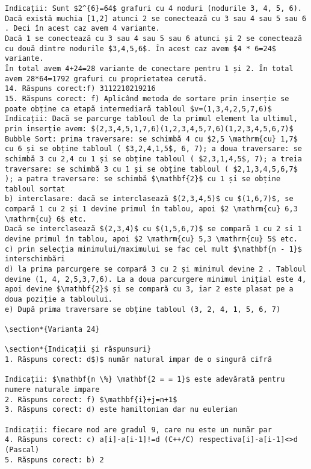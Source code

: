 \begin{verbatim}
Indicații: Sunt $2^{6}=64$ grafuri cu 4 noduri (nodurile 3, 4, 5, 6).
Dacă există muchia [1,2] atunci 2 se conectează cu 3 sau 4 sau 5 sau 6 . Deci în acest caz avem 4 variante.
Dacă 1 se conectează cu 3 sau 4 sau 5 sau 6 atunci și 2 se conectează cu două dintre nodurile $3,4,5,6$. În acest caz avem $4 * 6=24$ variante.
În total avem 4+24=28 variante de conectare pentru 1 și 2. În total avem 28*64=1792 grafuri cu proprietatea cerută.
14. Răspuns corect:f) 3112210219216
15. Răspuns corect: f) Aplicând metoda de sortare prin inserție se poate obține ca etapă intermediară tabloul $v=(1,3,4,2,5,7,6)$
Indicații: Dacă se parcurge tabloul de la primul element la ultimul, prin inserție avem: $(2,3,4,5,1,7,6)(1,2,3,4,5,7,6)(1,2,3,4,5,6,7)$
Bubble Sort: prima traversare: se schimbă 4 cu $2,5 \mathrm{cu} 1,7$ cu 6 și se obține tabloul ( $3,2,4,1,5$, 6, 7); a doua traversare: se schimbă 3 cu 2,4 cu 1 și se obține tabloul ( $2,3,1,4,5$, 7); a treia traversare: se schimbă 3 cu 1 și se obține tabloul ( $2,1,3,4,5,6,7$ ); a patra traversare: se schimbă $\mathbf{2}$ cu 1 și se obține tabloul sortat
b) interclasare: dacă se interclasează $(2,3,4,5)$ cu $(1,6,7)$, se compară 1 cu 2 și 1 devine primul în tablou, apoi $2 \mathrm{cu} 6,3 \mathrm{cu} 6$ etc.
Dacă se interclasează $(2,3,4)$ cu $(1,5,6,7)$ se compară 1 cu 2 si 1 devine primul în tablou, apoi $2 \mathrm{cu} 5,3 \mathrm{cu} 5$ etc.
c) prin selecția minimului/maximului se fac cel mult $\mathbf{n - 1}$ interschimbări
d) la prima parcurgere se compară 3 cu 2 și minimul devine 2 . Tabloul devine (1, 4, 2,5,3,7,6). La a doua parcurgere minimul inițial este 4, apoi devine $\mathbf{2}$ și se compară cu 3, iar 2 este plasat pe a doua poziție a tabloului.
e) După prima traversare se obține tabloul (3, 2, 4, 1, 5, 6, 7)

\section*{Varianta 24}

\section*{Indicații și răspunsuri}
1. Răspuns corect: d$)$ număr natural impar de o singură cifră

Indicații: $\mathbf{n \%} \mathbf{2 = = 1}$ este adevărată pentru numere naturale impare
2. Răspuns corect: f) $\mathbf{i}+j=n+1$
3. Răspuns corect: d) este hamiltonian dar nu eulerian

Indicații: fiecare nod are gradul 9, care nu este un număr par
4. Răspuns corect: c) a[i]-a[i-1]!=d (C++/C) respectiva[i]-a[i-1]<>d (Pascal)
5. Răspuns corect: b) 2


\end{verbatim}
